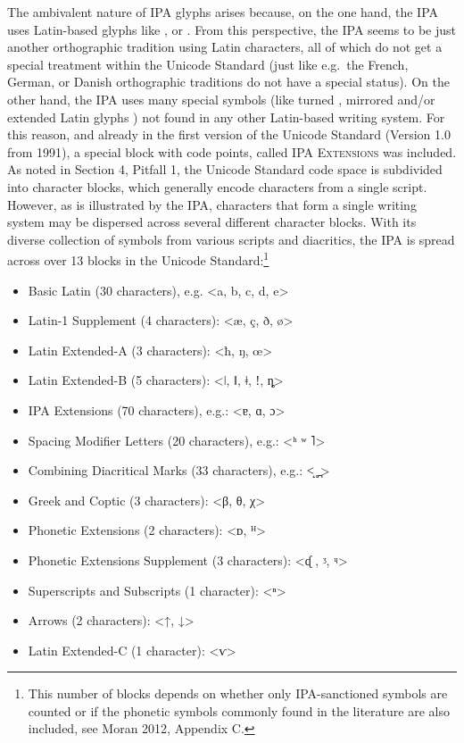 The ambivalent nature of IPA glyphs arises because, on the one hand, the IPA uses Latin-based glyphs like , or . From this perspective, the IPA seems to be just another orthographic tradition using Latin characters, all of which do not get a special treatment within the Unicode Standard (just like e.g.~the French, German, or Danish orthographic traditions do not have a special status). On the other hand, the IPA uses many special symbols (like turned , mirrored and/or extended Latin glyphs ) not found in any other Latin-based writing system. For this reason, and already in the first version of the Unicode Standard (Version 1.0 from 1991), a special block with code points, called \textsc{IPA Extensions} was included. As noted in Section 4, Pitfall 1, the Unicode Standard code space is subdivided into character blocks, which generally encode characters from a single script. However, as is illustrated by the IPA, characters that form a single writing system may be dispersed across several different character blocks. With its diverse collection of symbols from various scripts and diacritics, the IPA is spread across over 13 blocks in the Unicode Standard:\footnote{This number of blocks depends on whether only IPA-sanctioned symbols are counted or if the phonetic symbols commonly found in the literature are also included, see Moran 2012, Appendix C.}

\begin{itemize}
	\item Basic Latin (30 characters), e.g. <a, b, c, d, e> 
	\item Latin-1 Supplement (4 characters): <æ, ç, ð, ø\textgreater{} 
	\item Latin Extended-A (3 characters): <ħ, ŋ, œ> 
	\item Latin Extended-B (5 characters): <ǀ, ǁ, ǂ, ǃ, ȵ> 
	\item IPA Extensions (70 characters), e.g.: <ɐ, ɑ, ɔ> 
	\item Spacing Modifier Letters (20 characters), e.g.: <ʰ ʷ ˥> 
	\item Combining Diacritical Marks (33 characters), e.g.: <̝ ̥ ̪> 
	\item Greek and Coptic (3 characters): <β, θ, χ> 
	\item Phonetic Extensions (2 characters): <ᴅ, ᴴ> 
	\item Phonetic Extensions Supplement (3 characters): <ᶑ , ᶾ, ᶣ> 
	\item Superscripts and Subscripts (1 character): <ⁿ> 
	\item Arrows (2 characters): \textless{}↑, ↓\textgreater{} 
	\item Latin Extended-C (1 character): <ⱱ> 
\end{itemize}

